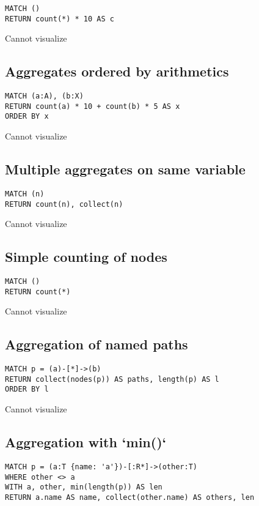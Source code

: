\begin{lstlisting}
MATCH ()
RETURN count(*) * 10 AS c
\end{lstlisting}

Cannot visualize
\subsection{Aggregates ordered by arithmetics}

\begin{lstlisting}
MATCH (a:A), (b:X)
RETURN count(a) * 10 + count(b) * 5 AS x
ORDER BY x
\end{lstlisting}

Cannot visualize
\subsection{Multiple aggregates on same variable}

\begin{lstlisting}
MATCH (n)
RETURN count(n), collect(n)
\end{lstlisting}

Cannot visualize
\subsection{Simple counting of nodes}

\begin{lstlisting}
MATCH ()
RETURN count(*)
\end{lstlisting}

Cannot visualize
\subsection{Aggregation of named paths}

\begin{lstlisting}
MATCH p = (a)-[*]->(b)
RETURN collect(nodes(p)) AS paths, length(p) AS l
ORDER BY l
\end{lstlisting}

Cannot visualize
\subsection{Aggregation with `min()`}

\begin{lstlisting}
MATCH p = (a:T {name: 'a'})-[:R*]->(other:T)
WHERE other <> a
WITH a, other, min(length(p)) AS len
RETURN a.name AS name, collect(other.name) AS others, len
\end{lstlisting}

